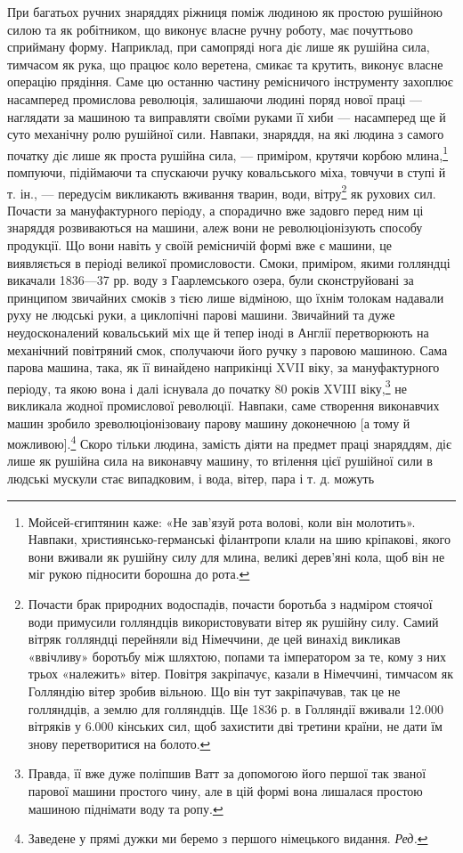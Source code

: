 При багатьох ручних знаряддях ріжниця поміж людиною як
простою рушійною силою та як робітником, що виконує власне
ручну роботу, має почуттьово сприйману форму. Наприклад,
при самопряді нога діє лише як рушійна сила, тимчасом як рука,
що працює коло веретена, смикає та крутить, виконує власне
операцію прядіння. Саме цю останню частину ремісничого інструменту
захоплює насамперед промислова революція, залишаючи
людині поряд нової праці — наглядати за машиною та виправляти
своїми руками її хиби — насамперед ще й суто механічну ролю
рушійної сили. Навпаки, знаряддя, на які людина з самого початку
діє лише як проста рушійна сила, — приміром, крутячи корбою
млина,\footnote{
Мойсей-єгиптянин каже: «Не зав’язуй рота волові, коли він молотить».
Навпаки, християнсько-германські філантропи клали на шию
кріпакові, якого вони вживали як рушійну силу для млина, великі дерев’яні
кола, щоб він не міг рукою підносити борошна до рота.
} помпуючи, підіймаючи та спускаючи ручку ковальського
міха, товчучи в ступі й т. ін., — передусім викликають вживання
тварин, води, вітру\footnote{
Почасти брак природних водоспадів, почасти боротьба з надміром
стоячої води примусили голляндців використовувати вітер як рушійну
силу. Самий вітряк голляндці перейняли від Німеччини, де цей винахід
викликав «ввічливу» боротьбу між шляхтою, попами та імператором за те,
кому з них трьох «належить» вітер. Повітря закріпачує, казали в Німеччині,
тимчасом як Голляндію вітер зробив вільною. Що він тут закріпачував,
так це не голляндців, а землю для голляндців. Ще 1836 р.
в Голляндії вживали 12.000 вітряків у 6.000 кінських сил, щоб захистити
дві третини країни, не дати їм знову перетворитися на болото.
} як рухових сил. Почасти за мануфактурного
періоду, а спорадично вже задовго перед ним ці знаряддя
розвиваються на машини, алеж вони не революціонізують способу
продукції. Що вони навіть у своїй ремісничій формі вже є
машини, це виявляється в періоді великої промисловости. Смоки,
приміром, якими голляндці викачали 1836—37 рр. воду з Гаарлемського
озера, були сконструйовані за принципом звичайних
смоків з тією лише відміною, що їхнім толокам надавали руху не
людські руки, а циклопічні парові машини. Звичайний та дуже
неудосконалений ковальський міх ще й тепер іноді в Англії перетворюють
на механічний повітряний смок, сполучаючи його
ручку з паровою машиною. Сама парова машина, така, як її
винайдено наприкінці XVII віку, за мануфактурного періоду,
та якою вона і далі існувала до початку 80 років XVIII віку,\footnote{
Правда, її вже дуже поліпшив Ватт за допомогою його першої
так званої парової машини простого чину, але в цій формі вона лишалася
простою машиною піднімати воду та ропу.
}
не викликала жодної промислової революції. Навпаки, саме створення
виконавчих машин зробило зреволюціонізоваиу парову
машину доконечною [а тому й можливою].\footnote*{
Заведене у прямі дужки ми беремо з першого німецького видання.
\emph{Ред.}
} Скоро тільки людина,
замість діяти на предмет праці знаряддям, діє лише як рушійна
сила на виконавчу машину, то втілення цієї рушійної сили в
людські мускули стає випадковим, і вода, вітер, пара і т. д. можуть
\parbreak{}  %
